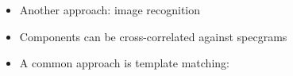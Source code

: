 \documentclass[t, xcolor={dvipsnames}]{beamer}
\begin{document}

\begin{frame}[fragile]
  \vspace{0.5cm}
  \begin{addmargin}{0.5cm}
    \begin{itemize}
      \item Another approach: image recognition
      \item Components can be cross-correlated against specgrams
      \item A common approach is template matching:
    \end{itemize}


  \end{addmargin}


\end{frame}
\end{document}
